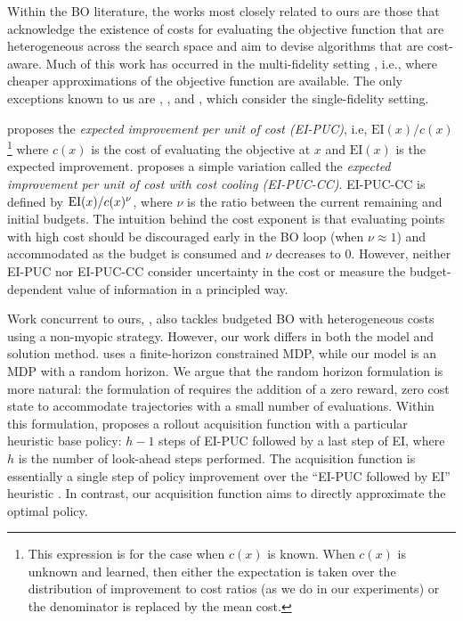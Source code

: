 Within the BO literature, the works most closely related to ours are those that acknowledge the existence of costs for evaluating the objective function that are heterogeneous across the search space and aim to devise algorithms that are cost-aware. Much of this work has occurred in the multi-fidelity setting \citep{swersky2013multi,kandasamy2016gaussian,kandasamy2017multi, poloczek2017multi, song2019general, wu2020practical}, i.e., where cheaper approximations of the objective function are available. The only exceptions known to us are \cite{Snoek2012ML}, \cite{lee2020cost}, and \cite{lee2021}, which consider the single-fidelity setting.


\cite{Snoek2012ML} proposes the \textit{expected improvement per unit of cost (EI-PUC)}, i.e, $\mathrm{EI}(x) / c(x)$\footnote{This expression is for the case when $c(x)$ is known. When $c(x)$ is unknown and learned, then either the expectation is taken over the distribution of improvement to cost ratios (as we do in our experiments) or the denominator is replaced by the mean cost.} where $c(x)$ is the cost of evaluating the objective at $x$ and $\mathrm{EI}(x)$ is the expected improvement. \cite{lee2020cost} proposes a simple variation called the \textit{expected improvement per unit of cost with cost cooling (EI-PUC-CC)}. EI-PUC-CC is defined by $\textnormal{EI}(x)/c(x)^\nu$, where $\nu$ is the ratio between the current remaining and initial budgets. The intuition behind the cost exponent is that evaluating points with high cost should be discouraged early in the BO loop (when $\nu \approx 1$) and accommodated as the budget is consumed and $\nu$ decreases to $0$. However, neither EI-PUC nor EI-PUC-CC 
consider uncertainty in the cost or measure the budget-dependent value of information in a principled way. 

Work concurrent to ours, \cite{lee2021}, also tackles budgeted BO with heterogeneous costs using a non-myopic strategy. However, our work differs in both the model and solution method. \cite{lee2021} uses a finite-horizon constrained MDP, while our model is an MDP with a random horizon.
We argue that the
random horizon formulation is more natural: the formulation of \cite{lee2021} requires the addition of a zero reward, zero cost state to accommodate trajectories with a small number of evaluations. Within this formulation, \cite{lee2021} proposes a rollout acquisition function with a particular heuristic base policy: $h-1$ steps of EI-PUC followed by a last step of EI, where $h$ is the number of look-ahead steps performed. The acquisition function is essentially a single step of policy improvement over the ``EI-PUC followed by EI'' heuristic \citep{sutton2018reinforcement}. In contrast, our acquisition function aims to directly approximate the optimal policy.

